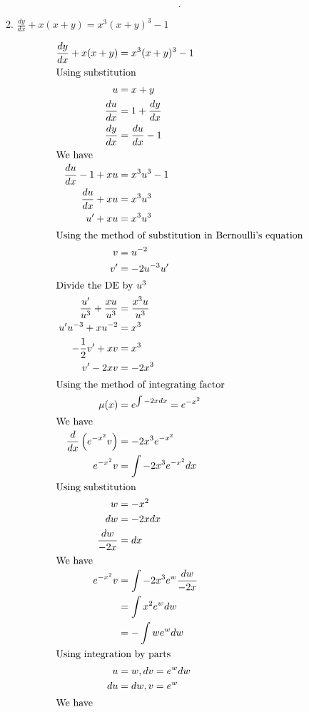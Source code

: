 \documentclass{zc-ust-hw}
\begin{document}
\begin{enumerate}
\begin{enumerate}
\begin{sol}
\[          .\] 
        \end{sol}
      \item $\frac{d y}{d x}+x(x+y)=x^3(x+y)^3-1$
        \begin{sol}
          \begin{align}
            \frac{dy}{dx}+x(x+y)&=x^3(x+y)^3-1\\
            \intertext{Using substitution}
            u&=x+y\\
            \frac{du}{dx}&=1+\frac{dy}{dx}\\
            \frac{dy}{dx}&=\frac{du}{dx}-1\\
            \intertext{We have}
            \frac{du}{dx}-1+xu&=x^3u^3-1\\
            \frac{du}{dx}+xu&=x^3u^3\\
            u'+xu&=x^3u^3\\
            \intertext{Using the method of substitution in Bernoulli’s equation}
            v&=u^{-2}\\
            v'&=-2u^{-3}u'\\
            \intertext{Divide the DE by $u^3$}
            \frac{u'}{u^3}+\frac{xu}{u^3}&=\frac{x^3u}{u^3}\\
            u'u^{-3} +xu^{-2} &=x^3\\
            -\frac{1}{2}v'+xv&=x^3\\
            v'-2xv&=-2x^3\\
            \intertext{Using the method of integrating factor}
            \mu(x)&=e^{\int -2x dx}=e^{-x^2}\\
            \intertext{We have}
            \frac{d}{dx}\left(e^{-x^2}v\right)&=-2x^3e^{-x^2}\\
            e^{-x^2}v&=\int -2x^3e^{-x^2} dx\\
            \intertext{Using substitution}
            w&=-x^2\\
            dw&=-2xdx\\
            \frac{dw}{-2x}&=dx\\
            \intertext{We have}
            e^{-x^2}v&=\int -2x^3e^w \frac{dw}{-2x}\\
                     &=\int x^2e^w dw\\
                     &=-\int we^w dw\\
            \intertext{Using integration by parts}
            u&=w, dv=e^w dw\\
            du&=dw, v=e^w\\
            \intertext{We have}

\end{align}
\end{sol}
\end{enumerate}
\end{enumerate}
\end{document}
